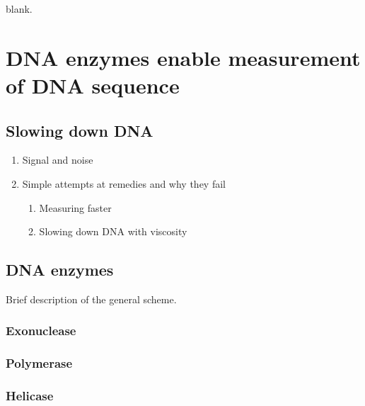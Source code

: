 \begin{savequote}[75mm]
blank.
\end{savequote}

\chapter{DNA enzymes enable measurement of DNA sequence}
\label{dna_enzymes}

\section{Slowing down DNA}
\begin{enumerate}
\item Signal and noise
\item Simple attempts at remedies and why they fail
\begin{enumerate}
\item Measuring faster
\item Slowing down DNA with viscosity
\end{enumerate}
\end{enumerate}

\section{DNA enzymes}

Brief description of the general scheme.

\subsection{Exonuclease}

\subsection{Polymerase}

\subsection{Helicase}
